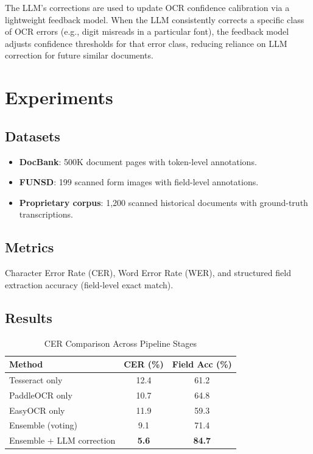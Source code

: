 \documentclass[conference]{IEEEtran}
\begin{document}
The LLM's corrections are used to update OCR confidence calibration via a lightweight feedback model. When the LLM consistently corrects a specific class of OCR errors (e.g., digit misreads in a particular font), the feedback model adjusts confidence thresholds for that error class, reducing reliance on LLM correction for future similar documents.

\section{Experiments}

\subsection{Datasets}
\begin{itemize}
\item \textbf{DocBank}: 500K document pages with token-level annotations.
\item \textbf{FUNSD}: 199 scanned form images with field-level annotations.
\item \textbf{Proprietary corpus}: 1,200 scanned historical documents with ground-truth transcriptions.
\end{itemize}

\subsection{Metrics}
Character Error Rate (CER), Word Error Rate (WER), and structured field extraction accuracy (field-level exact match).

\subsection{Results}

\begin{table}[htbp]
\caption{CER Comparison Across Pipeline Stages}
\begin{center}
\begin{tabular}{|l|c|c|}
\hline
\textbf{Method} & \textbf{CER (\%)} & \textbf{Field Acc (\%)} \\
\hline
Tesseract only & 12.4 & 61.2 \\
PaddleOCR only & 10.7 & 64.8 \\
EasyOCR only & 11.9 & 59.3 \\
Ensemble (voting) & 9.1 & 71.4 \\
Ensemble + LLM correction & \textbf{5.6} & \textbf{84.7} \\
\hline
\end{tabular}
\label{tab:results}
\end{center}
\end{table}
\end{document}
